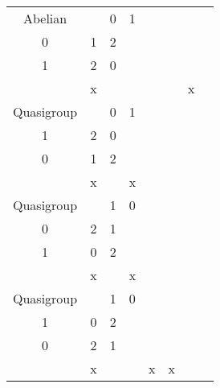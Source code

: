\begin{longtable}{| c | c | c | c | c | c | c | c |}
    \rowcolor{cyan} Abelian &
\( \begin{smallmatrix}
    2 & 0 & 1 \\
    0 & 1 & 2 \\
    1 & 2 & 0 \\
\end{smallmatrix} \)
 &  \cellcolor[HTML]{AA0044} x &   &   &   &   & \cellcolor[HTML]{AA0044} x \\ \hline
    Quasigroup &
\( \begin{smallmatrix}
    2 & 0 & 1 \\
    1 & 2 & 0 \\
    0 & 1 & 2 \\
\end{smallmatrix} \)
 &  \cellcolor[HTML]{AA0044} x &   & \cellcolor[HTML]{AA0044} x &   &   &   \\ \hline
    Quasigroup &
\( \begin{smallmatrix}
    2 & 1 & 0 \\
    0 & 2 & 1 \\
    1 & 0 & 2 \\
\end{smallmatrix} \)
 &  \cellcolor[HTML]{AA0044} x &   & \cellcolor[HTML]{AA0044} x &   &   &   \\ \hline
    Quasigroup &
\( \begin{smallmatrix}
    2 & 1 & 0 \\
    1 & 0 & 2 \\
    0 & 2 & 1 \\
\end{smallmatrix} \)
 &  \cellcolor[HTML]{AA0044} x &   &   & \cellcolor[HTML]{AA0044} x & \cellcolor[HTML]{AA0044} x &   \\ \hline
\end{longtable}
